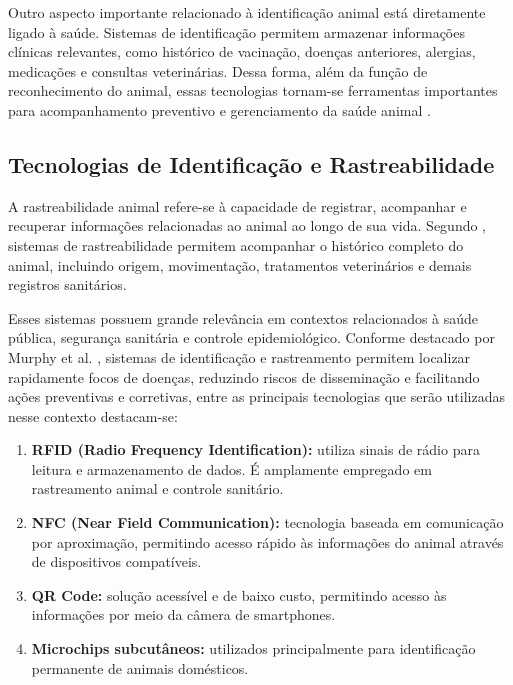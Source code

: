 \documentclass{UNESC}
\begin{document}
Outro aspecto importante relacionado à identificação animal está diretamente ligado à saúde. Sistemas de identificação permitem armazenar informações clínicas relevantes, como histórico de vacinação, doenças anteriores, alergias, medicações e consultas veterinárias. Dessa forma, além da função de reconhecimento do animal, essas tecnologias tornam-se ferramentas importantes para acompanhamento preventivo e gerenciamento da saúde animal \cite{iskandar2023,moraes2024}.

\subsection{Tecnologias de Identificação e Rastreabilidade}

A rastreabilidade animal refere-se à capacidade de registrar, acompanhar e recuperar informações relacionadas ao animal ao longo de sua vida. Segundo , sistemas de rastreabilidade permitem acompanhar o histórico completo do animal, incluindo origem, movimentação, tratamentos veterinários e demais registros sanitários.

Esses sistemas possuem grande relevância em contextos relacionados à saúde pública, segurança sanitária e controle epidemiológico. Conforme destacado por Murphy et al. \cite{murphy2008}, sistemas de identificação e rastreamento permitem localizar rapidamente focos de doenças, reduzindo riscos de disseminação e facilitando ações preventivas e corretivas, entre as principais tecnologias que serão utilizadas nesse contexto destacam-se:

\begin{enumerate}[label=\alph*)]
    \item \textbf{RFID (Radio Frequency Identification):} utiliza sinais de rádio para leitura e armazenamento de dados. É amplamente empregado em rastreamento animal e controle sanitário.
    
    \item \textbf{NFC (Near Field Communication):} tecnologia baseada em comunicação por aproximação, permitindo acesso rápido às informações do animal através de dispositivos compatíveis.
    
    \item \textbf{QR Code:} solução acessível e de baixo custo, permitindo acesso às informações por meio da câmera de smartphones.
    
    \item \textbf{Microchips subcutâneos:} utilizados principalmente para identificação permanente de animais domésticos.
\end{enumerate}
\end{document}
